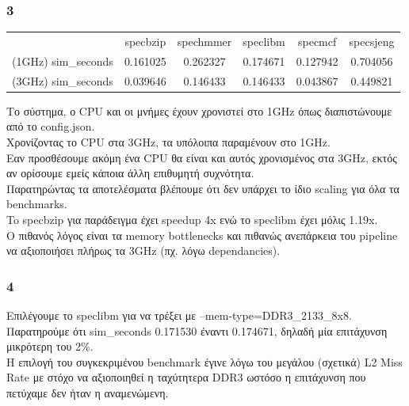 \documentclass{article}
\begin{document}
\subsubsection{3}
\begin{center}
\begin{tabular}{|c|c|c|c|c|c|}
 \hline
   & specbzip & spechmmer & speclibm & specmcf & specsjeng\\
 (1GHz) sim\_seconds & 0.161025 & 0.262327 & 0.174671 & 0.127942 & 0.704056\\
 (3GHz) sim\_seconds & 0.039646 & 0.146433 & 0.146433 & 0.043867 & 0.449821\\
 \hline
\end{tabular}
\end{center}
Το σύστημα, ο CPU και οι μνήμες έχουν χρονιστεί στο 1GHz όπως διαπιστώνουμε από το config.json. \\
Χρονίζοντας το CPU στα 3GHz, τα υπόλοιπα παραμένουν στο 1GHz. \\
Εαν προσθέσουμε ακόμη ένα CPU θα είναι και αυτός χρονισμένος στα 3GHz, εκτός αν ορίσουμε εμείς κάποια άλλη επιθυμητή συχνότητα. \\
Παρατηρώντας τα αποτελέσματα βλέπουμε ότι δεν υπάρχει το ίδιο scaling για όλα τα benchmarks. \\
To specbzip για παράδειγμα έχει speedup 4x ενώ το speclibm έχει μόλις 1.19x. \\
Ο πιθανός λόγος είναι τα memory bottlenecks και πιθανώς ανεπάρκεια του pipeline να αξιοποιήσει πλήρως τα 3GHz (πχ. λόγω dependancies). \\ 
\subsubsection{4}
Επιλέγουμε το speclibm για να τρέξει με --mem-type=DDR3\_2133\_8x8. \\
Παρατηρούμε ότι sim\_seconds 0.171530 έναντι 0.174671, δηλαδή μία επιτάχυνση μικρότερη του 2\%. \\
Η επιλογή του συγκεκριμένου benchmark έγινε λόγω του μεγάλου (σχετικά) L2 Miss Rate με στόχο να αξιοποιηθεί η ταχύτητερα DDR3 ωστόσο η επιτάχυνση που πετύχαμε δεν ήταν η αναμενώμενη. \\
\end{document}
